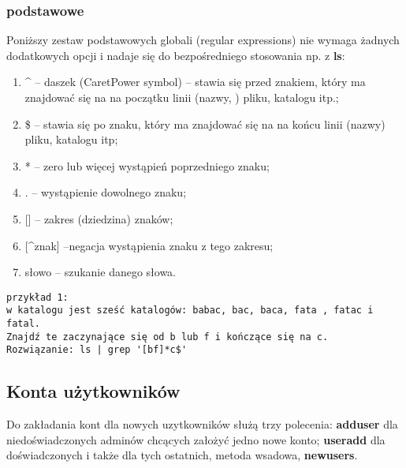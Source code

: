 \documentclass[a4paper,titlepage,12pt]{mwart}
\begin{document}
\subsubsection{podstawowe}
Poniższy zestaw podstawowych globali (regular expressions) nie wymaga żadnych dodatkowych opcji i nadaje się
do bezpośredniego stosowania np. z \textbf{ls}:
\begin{enumerate}
\begin{enumerate}
\item {^ -- daszek (Caret\/Power symbol) -- stawia się przed znakiem, który ma znajdować się na na początku linii (nazwy,
) pliku, katalogu itp.;}
\item {\$ -- stawia się po znaku, który ma znajdować się na na końcu linii (nazwy) pliku, katalogu itp;}
\item {* -- zero lub więcej wystąpień poprzedniego znaku;}
\item {. -- wystąpienie dowolnego znaku;}
\item {[] -- zakres (dziedzina) znaków;}
\item {[^znak] --negacja wystąpienia znaku z tego zakresu;}
\item {słowo -- szukanie danego słowa.}
\end{enumerate}
\end{enumerate} 
\begin{verbatim}
przykład 1:
w katalogu jest sześć katalogów: babac, bac, baca, fata , fatac i fatal.
Znajdź te zaczynające się od b lub f i kończące się na c.
Rozwiązanie: ls | grep '[bf]*c$'
\end{verbatim}
\subsection{Konta użytkowników}
Do zakładania kont dla nowych uzytkowników służą trzy polecenia: \textbf{adduser} dla niedoświadczonych adminów chcących założyć jedno nowe konto; \textbf{useradd} dla doświadczonych i także dla tych ostatnich, metoda wsadowa, \textbf{newusers}.
\end{document}
